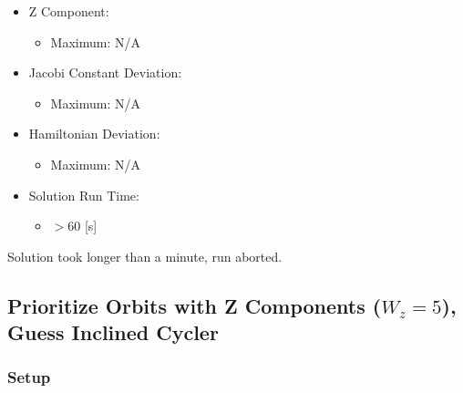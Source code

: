 \documentclass{article}
\begin{document}
\begin{itemize}
    \item Z Component:
    \begin{itemize}
        \item Maximum: N/A
    \end{itemize}
    \item Jacobi Constant Deviation:
    \begin{itemize}
        \item Maximum: N/A
    \end{itemize}
    \item Hamiltonian Deviation:
    \begin{itemize}
        \item Maximum: N/A
    \end{itemize}
    \item Solution Run Time:
    \begin{itemize}
        \item $>$60 [s]
    \end{itemize}  
\end{itemize}

Solution took longer than a minute, run aborted.

\newpage

\subsection{Prioritize Orbits with Z Components ($W_z = 5$), Guess Inclined Cycler}

\subsubsection{Setup}
\end{document}
